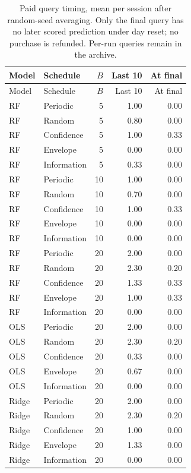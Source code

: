 \small\setlength{\tabcolsep}{4pt}
\begin{longtable}{llrrr}
\caption{Paid query timing, mean per session after random-seed averaging. Only the final query has no later scored prediction under day reset; no purchase is refunded. Per-run queries remain in the archive.}\label{tab:s_timing}\\
\toprule
Model & Schedule & $B$ & Last 10 & At final \\ \midrule\endfirsthead
\toprule
Model & Schedule & $B$ & Last 10 & At final \\ \midrule\endhead
\bottomrule\endfoot
RF & Periodic & 5 & 1.00 & 0.00 \\
RF & Random & 5 & 0.80 & 0.00 \\
RF & Confidence & 5 & 1.00 & 0.33 \\
RF & Envelope & 5 & 0.00 & 0.00 \\
RF & Information & 5 & 0.33 & 0.00 \\
RF & Periodic & 10 & 1.00 & 0.00 \\
RF & Random & 10 & 0.70 & 0.00 \\
RF & Confidence & 10 & 1.00 & 0.33 \\
RF & Envelope & 10 & 0.00 & 0.00 \\
RF & Information & 10 & 0.00 & 0.00 \\
RF & Periodic & 20 & 2.00 & 0.00 \\
RF & Random & 20 & 2.30 & 0.20 \\
RF & Confidence & 20 & 1.33 & 0.33 \\
RF & Envelope & 20 & 1.00 & 0.33 \\
RF & Information & 20 & 0.00 & 0.00 \\
OLS & Periodic & 20 & 2.00 & 0.00 \\
OLS & Random & 20 & 2.30 & 0.20 \\
OLS & Confidence & 20 & 0.33 & 0.00 \\
OLS & Envelope & 20 & 0.67 & 0.00 \\
OLS & Information & 20 & 0.00 & 0.00 \\
Ridge & Periodic & 20 & 2.00 & 0.00 \\
Ridge & Random & 20 & 2.30 & 0.20 \\
Ridge & Confidence & 20 & 1.00 & 0.00 \\
Ridge & Envelope & 20 & 1.33 & 0.00 \\
Ridge & Information & 20 & 0.00 & 0.00 \\
\end{longtable}\normalsize
